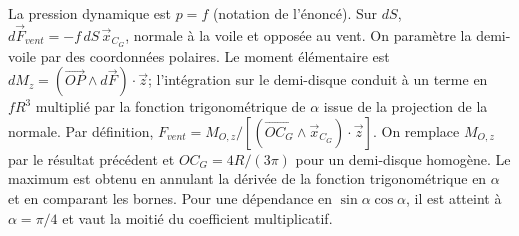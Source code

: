 \begin{corrigebox}
La pression dynamique est $p=f$ (notation de l'énoncé). Sur
                $dS$, $d\vec F_{vent}=-f\,dS\,\vec x_{C_G}$, normale à la voile et
                opposée au vent.
On paramètre la demi-voile par des coordonnées polaires. Le moment
                élémentaire est $dM_z=(\overrightarrow{OP}\wedge d\vec F)\cdot\vec z$;
                l'intégration sur le demi-disque conduit à un terme en $fR^3$ multiplié
                par la fonction trigonométrique de $\alpha$ issue de la projection de la
                normale.
Par définition,
                $F_{vent}=M_{O,z}/[(\overrightarrow{OC_G}\wedge\vec x_{C_G})\cdot\vec z]$.
                On remplace $M_{O,z}$ par le résultat précédent et
                $OC_G=4R/(3\pi)$ pour un demi-disque homogène.
Le maximum est obtenu en annulant la dérivée de la fonction
                trigonométrique en $\alpha$ et en comparant les bornes. Pour une dépendance
                en $\sin\alpha\cos\alpha$, il est atteint à $\alpha=\pi/4$ et vaut la
                moitié du coefficient multiplicatif.
\end{corrigebox}
